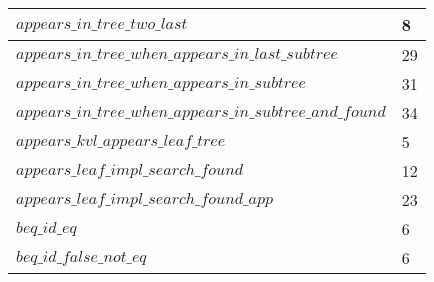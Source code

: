 \begin{tabular}{| l | l |}
$appears\_in\_tree\_two\_last$ & 8 \\ \hline
$appears\_in\_tree\_when\_appears\_in\_last\_subtree$ & 29 \\ \hline
$appears\_in\_tree\_when\_appears\_in\_subtree$ & 31 \\ \hline
$appears\_in\_tree\_when\_appears\_in\_subtree\_and\_found$ & 34 \\ \hline
$appears\_kvl\_appears\_leaf\_tree$ & 5 \\ \hline
$appears\_leaf\_impl\_search\_found$ & 12 \\ \hline
$appears\_leaf\_impl\_search\_found\_app$ & 23 \\ \hline
$beq\_id\_eq$ & 6 \\ \hline
$beq\_id\_false\_not\_eq$ & 6 \\ \hline
\end{tabular}
\newpage
